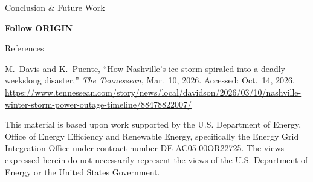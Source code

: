 \documentclass{article}
\newlength{\posgap}\setlength{\posgap}{0.8in}
\newcommand{\boxgap}{\par\vspace{\posgap}}
\newlength{\figgap}\setlength{\figgap}{18pt}
\begin{document}
\begin{minipage}[t]{\colwidth}
\begin{posterbox}{Conclusion \& Future Work}
\par\addvspace{\figgap}
\begin{tcolorbox}[enhanced, colback=utorange!8, colframe=utorange!60,
  boxrule=2pt, arc=0.2in, left=0.25in, right=0.25in, top=0.2in, bottom=0.2in,
  before skip=0pt, after skip=0pt]
\begin{minipage}[c]{2.4in}
\end{minipage}\hspace{0.4in}%
\begin{minipage}[c]{\dimexpr\linewidth-2.8in\relax}
  {\fontsize{40}{48}\selectfont\bfseries Follow ORIGIN\par}
  \vspace{10pt}
  \githubmark[utsmokey]{0.4in}
\end{minipage}
\end{tcolorbox}
\end{posterbox}
\boxgap
\begin{posterbox}{References}
\RaggedRight
{\fontsize{26}{32}\selectfont
\begin{enumerate}[label={[\arabic*]}, leftmargin=2em]
  \item M.~Davis and K.~Puente, ``How Nashville's ice storm spiraled into a
        deadly weekslong disaster,'' \textit{The Tennessean}, Mar.~10, 2026.
        Accessed: Oct.~14, 2026.
        \url{https://www.tennessean.com/story/news/local/davidson/2026/03/10/nashville-winter-storm-power-outage-timeline/88478822007/}
\end{enumerate}}
\end{posterbox}
\end{minipage}

\par\vfill
{\centering\fontsize{22}{28}\selectfont\color{utsmokey}
This material is based upon work supported by the U.S. Department of Energy,
Office of Energy Efficiency and Renewable Energy, specifically the Energy Grid
Integration Office under contract number DE-AC05-00OR22725. The views expressed
herein do not necessarily represent the views of the U.S. Department of Energy
or the United States Government.\par}
\end{document}
